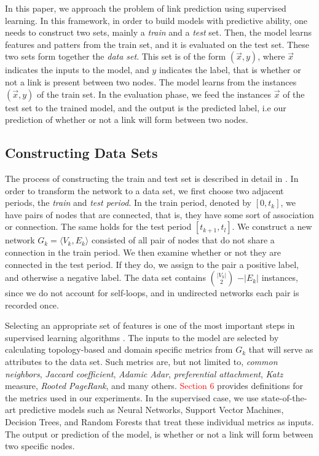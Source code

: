\documentclass{acm_proc_article-sp}
\begin{document}
In this paper, we approach the problem of link prediction using supervised learning. In this framework, in order to build models with predictive ability, one needs to construct two sets, mainly a \textit{train} and a \textit{test} set. Then, the model learns features and patters from the train set, and it is evaluated on the test set. These two sets form together the \textit{data set}. This set is of the form $(\vec{x},y)$, where $\vec{x}$ indicates the inputs to the model, and $y$ indicates the label, that is whether or not a link is present between two nodes. The model learns from the instances $(\vec{x},y)$ of the train set. In the evaluation phase, we feed the instances $\vec{x}$ of the test set to the trained model, and the output is the predicted label, i.e our prediction of whether or not a link will form between two nodes.

\subsection{Constructing Data Sets}
\label{Sect.2a}

The process of constructing the train and test set is described in detail in \cite{Hasan06linkprediction, Lichtenwalter:2010:NPM:1835804.1835837}. In order to transform the network to a data set, we first choose two adjacent periods, the \textit{train} and \textit{test period}. In the train period, denoted by $[0,t_k]$, we have pairs of nodes that are connected, that is, they have some sort of association or connection. The same holds for the test period $[t_{k+1},t_l]$. We construct a new network $G_k = \langle V_k, E_k \rangle$ consisted of all pair of nodes that do not share a connection in the train period. We then examine whether or not they are connected in the test period. If they do, we assign to the pair a positive label, and otherwise a negative label. The data set contains $|V_k| \choose 2$ $-|E_k|$ instances, since we do not account for self-loops, and in undirected networks each pair is recorded once. 

Selecting an appropriate set of features is one of the most important steps in supervised learning algorithms \cite{Hasan06linkprediction}. The inputs to the model are selected by calculating topology-based and domain specific metrics from $G_k$ that will serve as attributes to the data set. Such metrics are, but not limited to, \textit{common neighbors}, \textit{Jaccard coefficient}, \textit{Adamic Adar}, \textit{preferential attachment}, \textit{Katz} measure, \textit{Rooted PageRank}, and many others. \textcolor{red}{Section 6} provides definitions for the metrics used in our experiments. In the supervised case, we use state-of-the-art predictive models such as Neural Networks, Support Vector Machines, Decision Trees, and Random Forests that treat these individual metrics as inputs. The output or prediction of the model, is whether or not a link will form between two specific nodes. 
\end{document}
